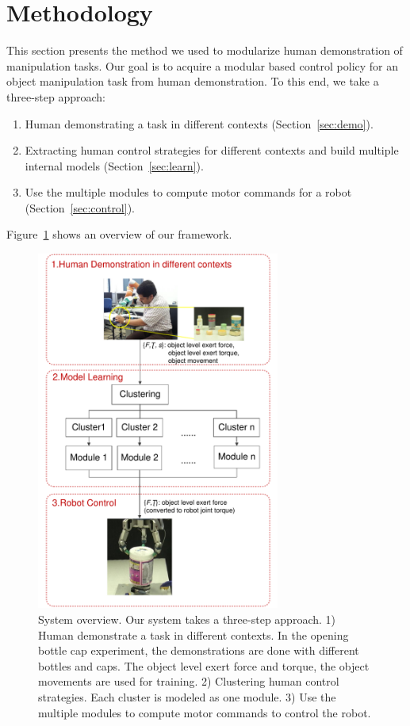 \section{Methodology}
\label{sec:method}
This section presents the method we used to modularize human demonstration of manipulation tasks. Our goal is to acquire a modular based control policy for an object manipulation task from human demonstration. To this end, we take a three-step approach:
\begin{enumerate}
\item Human demonstrating a task in different contexts (Section~\ref{sec:demo}).
\item Extracting human control strategies for different contexts and build multiple internal models (Section~\ref{sec:learn}).
\item Use the multiple modules to compute motor commands for a robot (Section~\ref{sec:control}).
\end{enumerate}

Figure~\ref{fig:overview} shows an overview of our framework.

\begin{figure}
  \centering
   \includegraphics[width=8cm]{./fig/overview5.pdf}
  \caption{ \scriptsize{System overview. Our system takes a three-step approach. 1) Human demonstrate a task in different contexts. In the opening bottle cap experiment, the demonstrations are done with different bottles and caps. The object level exert force and torque, the object movements are used for training. 2) Clustering human control strategies. Each cluster is modeled as one module. 3) Use the multiple modules to compute motor commands to control the robot.}
  }
\label{fig:overview}
\end{figure}


